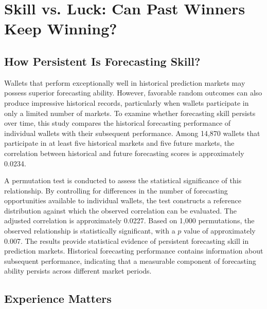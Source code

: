 \section{Skill vs. Luck: Can Past Winners Keep Winning?}\label{sec:skill}

\subsection{How Persistent Is Forecasting Skill?}

Wallets that perform exceptionally well in historical prediction markets may possess superior forecasting ability. However, favorable random outcomes can also produce impressive historical records, particularly when wallets participate in only a limited number of markets. To examine whether forecasting skill persists over time, this study compares the historical forecasting performance of individual wallets with their subsequent performance. Among 14,870 wallets that participate in at least five historical markets and five future markets, the correlation between historical and future forecasting scores is approximately 0.0234.

A permutation test is conducted to assess the statistical significance of this relationship. By controlling for differences in the number of forecasting opportunities available to individual wallets, the test constructs a reference distribution against which the observed correlation can be evaluated. The adjusted correlation is approximately 0.0227. Based on 1,000 permutations, the observed relationship is statistically significant, with a $p$ value of approximately 0.007. The results provide statistical evidence of persistent forecasting skill in prediction markets. Historical forecasting performance contains information about subsequent performance, indicating that a measurable component of forecasting ability persists across different market periods.


\subsection{Experience Matters}

